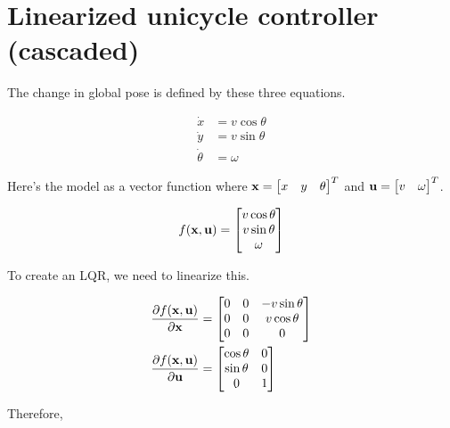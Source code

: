 \section{Linearized unicycle controller (cascaded)}

The change in global pose is defined by these three equations.

\begin{align*}
  \dot{x} &= v\cos\theta \\
  \dot{y} &= v\sin\theta \\
  \dot{\theta} &= \omega
\end{align*}

Here's the model as a vector function where
$\mathbf{x} = \begin{bmatrix} x & y & \theta \end{bmatrix}^T$ and
$\mathbf{u} = \begin{bmatrix} v & \omega \end{bmatrix}^T$.

\begin{equation}
  f(\mathbf{x}, \mathbf{u}) =
  \begin{bmatrix}
    v\cos\theta \\
    v\sin\theta \\
    \omega
  \end{bmatrix}
\end{equation}

To create an LQR, we need to linearize this.

\begin{align*}
  \frac{\partial f(\mathbf{x}, \mathbf{u})}{\partial\mathbf{x}} &=
  \begin{bmatrix}
    0 & 0 & -v\sin\theta \\
    0 & 0 & v\cos\theta \\
    0 & 0 & 0
  \end{bmatrix} \\
  \frac{\partial f(\mathbf{x}, \mathbf{u})}{\partial\mathbf{u}} &=
  \begin{bmatrix}
    \cos\theta & 0 \\
    \sin\theta & 0 \\
    0 & 1
  \end{bmatrix}
\end{align*}

Therefore,

